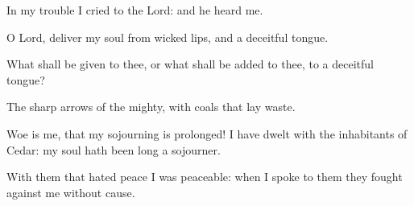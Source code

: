 ﻿\item In my trouble I cried to the Lord: and he heard me.
\item O Lord, deliver my soul from wicked lips, and a deceitful tongue.
\item What shall be given to thee, or what shall be added to thee, to a deceitful tongue?
\item The sharp arrows of the mighty, with coals that lay waste.
\item Woe is me, that my sojourning is prolonged! I have dwelt with the inhabitants of Cedar: my soul hath been long a sojourner.
\item With them that hated peace I was peaceable: when I spoke to them they fought against me without cause.

